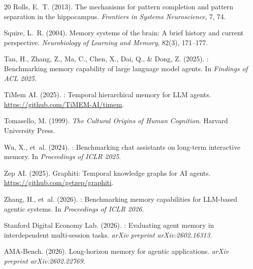 \documentclass{article}
\begin{document}
\begin{thebibliography}{20}
Rolls, E.~T. (2013).
\newblock The mechanisms for pattern completion and pattern separation in the hippocampus.
\newblock \emph{Frontiers in Systems Neuroscience}, 7, 74.

Squire, L.~R. (2004).
\newblock Memory systems of the brain: A brief history and current perspective.
\newblock \emph{Neurobiology of Learning and Memory}, 82(3), 171--177.

Tan, H., Zhang, Z., Ma, C., Chen, X., Dai, Q., \& Dong, Z. (2025).
: Benchmarking memory capability of large language model agents.
\newblock In \emph{Findings of ACL 2025}.

TiMem AI. (2025).
: Temporal hierarchical memory for {LLM} agents.
\newblock \url{https://github.com/TiMEM-AI/timem}.

Tomasello, M. (1999).
\newblock \emph{The Cultural Origins of Human Cognition}.
\newblock Harvard University Press.

Wu, X., et~al. (2024).
: Benchmarking chat assistants on long-term interactive memory.
\newblock In \emph{Proceedings of ICLR 2025}.

Zep AI. (2025).
\newblock Graphiti: Temporal knowledge graphs for {AI} agents.
\newblock \url{https://github.com/getzep/graphiti}.

Zhang, H., et~al. (2026).
: Benchmarking memory capabilities for {LLM}-based agentic systems.
\newblock In \emph{Proceedings of ICLR 2026}.

Stanford Digital Economy Lab. (2026).
: Evaluating agent memory in interdependent multi-session tasks.
\newblock \emph{arXiv preprint arXiv:2602.16313}.

AMA-Bench. (2026).
\newblock Long-horizon memory for agentic applications.
\newblock \emph{arXiv preprint arXiv:2602.22769}.

\end{thebibliography}
\end{document}
